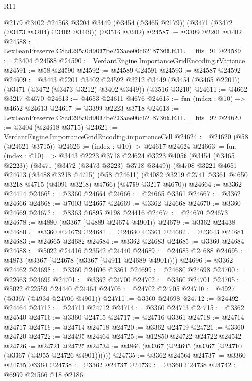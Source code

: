 \begin{lexlean}{R11}
\begin{coremodule}
    @2179
    @3402
    @24568
    @3204
    @3449
    (@3454 (@3465 @2179))
    (@3471 (@3472 (@3473 @3204) @3402 @3449))
    (@3516 @3202)
@24587 := @3399 @2201 @3402
@24588 := LexLeanPreserve.C8ad295a0d9097be233aee06c62187366.R11.__fits_91
@24589 := @3404 @24588
@24590 := VerdantEngine.ImportanceGridEncoding.rVariance
@24591 := @58 @24590
@24592 := @24589 @24591
@24593 := @24587 @24592
@24609 := @3443
    @2201
    @3402
    @24592
    @3212
    @3449
    (@3454 (@3465 @2201))
    (@3471 (@3472 (@3473 @3212) @3402 @3449))
    (@3516 @3210)
@24611 := @4662 @3217 @4670
@24613 := @4653 @24611 @4676
@24615 := fun (index : @10) => @4652 @24613
@24617 := @3399 @2223 @3718
@24618 := LexLeanPreserve.C8ad295a0d9097be233aee06c62187366.R11.__fits_92
@24620 := @3404 (@24618 @3715)
@24621 := VerdantEngine.ImportanceGridEncoding.importanceCell
@24624 := @24620 (@58 (@24621 @3715))
@24626 := (index : @10) -> @24617 @24624
@24663 := fun (index : @10) =>
  @3443
    @2223
    @3718
    @24624
    @3223
    @4056
    (@3454 (@3465 @2223))
    (@3471 (@3472 (@3473 @3223) @3718 @3449))
    (@4708
      @3221
      @4651
      @24613
      (@3488 @3218 @4715)
      (@58 @24611)
      (@4082 @3219 @2741 @3361 @4650 @3218 @4715 (@4090 @3218) @4766)
      (@4769 @3217 @4670))
@24664 := @3362 @24414
@24665 := @3360 @24664
@24666 := @24665 @3361
@24667 := @3362 @24666
@24668 := @7003 @24667
@24669 := @3362 @24668
@24670 := @3360 @24669
@24673 := @8363 @6895 @198 @24416
@24674 := @24670 @24673
@24678 := @4880 (@3367 (@4889 @24674 @4901))
@24679 := @3362 @24438
@24680 := @3360 @24679
@24681 := @24680 @3361
@24682 := @23643 @24681
@24683 := @24665 @24682
@24684 := @3362 @24683
@24685 := @3360 @24684
@24688 := @5022 @24416 @23542 @24440
@24689 := @24685 @24688
@24695 := @4873 (@3367 (@24678 (@3367 (@4911 @24689 @4901))))
@24696 := @3362 @24462
@24698 := @3360 @24696 @3361
@24699 := @24680 @24698
@24700 := @22663 @24699
@24701 := @3362 @24700
@24702 := @3360 @24701
@24705 := @5022 @22559 @24440 @24464
@24706 := @24702 @24705
@24710 := @4927 (@3367 (@4934 @24706 @4901))
@24711 := @3360 @24698
@24712 := @24492 @24464
@24713 := @24711 @24712
@24714 := @3360 @24713
@24715 := @3362 @24540
@24716 := @3360 @24715
@24717 := @24716 @3361
@24718 := @24714 @24717
@24719 := @24714 @24718
@24720 := @3362 @24719
@24721 := @3360 @24720
@24722 := @24495 @24464
@24725 := @12850 @24722 @24722 @24542
@24726 := @24721 @24725
@24734 := @4866 (@3367 (@24695 (@3367 (@24710 (@3367 (@4955 @24726 @4901))))))
@24735 := @3362 @24564
@24737 := @3360 @24735 @3364
@24738 := @3362 @24737
@24739 := @3360 @24738
@24742 := @6969 @24566 @18 @2186

\end{coremodule}
\end{lexlean}
